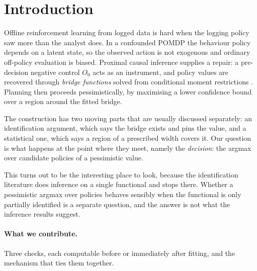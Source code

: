 \documentclass{article}
\theoremstyle{plain}
\theoremstyle{definition}
\begin{document}
\section{Introduction}
\label{sec:intro}

Offline reinforcement learning from logged data is hard when the logging policy
saw more than the analyst does. In a confounded POMDP the behaviour policy
depends on a latent state, so the observed action is not exogenous and ordinary
off-policy evaluation is biased. Proximal causal inference supplies a repair: a
pre-decision negative control $O_0$ acts as an instrument, and policy values are
recovered through \emph{bridge functions} solved from conditional moment
restrictions \citep{miao2018,tchetgen2020,hong2024}. Planning then proceeds
pessimistically, by maximising a lower confidence bound over a region around the
fitted bridge.

The construction has two moving parts that are usually discussed separately: an
identification argument, which says the bridge exists and pins the value, and a
statistical one, which says a region of a prescribed width covers it. Our
question is what happens at the point where they meet, namely the
\emph{decision}: the argmax over candidate policies of a pessimistic value.

This turns out to be the interesting place to look, because the identification
literature does inference on a single functional and stops there. Whether a
pessimistic argmax over policies behaves sensibly when the functional is only
partially identified is a separate question, and the answer is not what the
inference results suggest.

\paragraph{What we contribute.}
Three checks, each computable before or immediately after fitting, and the
mechanism that ties them together.
\end{document}
